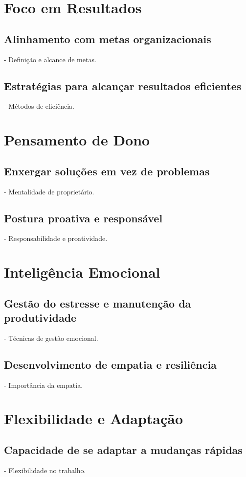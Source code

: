 \documentclass{ufersa}
\begin{document}
\section{Foco em Resultados}
\subsection{Alinhamento com metas organizacionais}
- Definição e alcance de metas.

\subsection{Estratégias para alcançar resultados eficientes}
- Métodos de eficiência.

\section{Pensamento de Dono}
\subsection{Enxergar soluções em vez de problemas}
- Mentalidade de proprietário.

\subsection{Postura proativa e responsável}
- Responsabilidade e proatividade.

\section{Inteligência Emocional}
\subsection{Gestão do estresse e manutenção da produtividade}
- Técnicas de gestão emocional.

\subsection{Desenvolvimento de empatia e resiliência}
- Importância da empatia.

\section{Flexibilidade e Adaptação}
\subsection{Capacidade de se adaptar a mudanças rápidas}
- Flexibilidade no trabalho.
\end{document}
